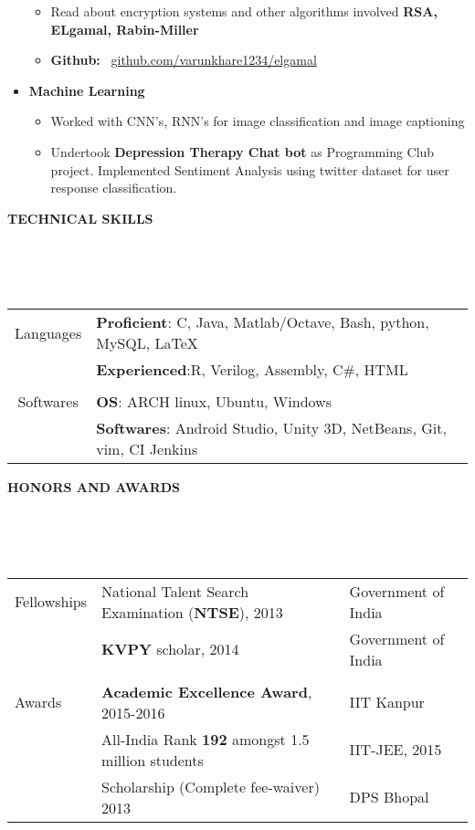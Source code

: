 \documentclass[a4paper,10pt]{article}
\newcommand{\lsep}{-0.5cm}
\newcommand{\resheading}[1]{{\small \colorbox{mygrey}{\begin{minipage}{0.975\textwidth}{\textbf{#1 \vphantom{p\^{E}}}}\end{minipage}}}}
\begin{document}
\begin{itemize}
\begin{itemize}
	\item Read about encryption systems and other algorithms involved \textbf{RSA, ELgamal, Rabin-Miller}
	\item \textbf{Github:} \ \href{https://github.com/varunkhare1234/elgamal}{github.com/varunkhare1234/elgamal}
	\end{itemize}
\item\textbf{Machine Learning}
    \begin{itemize}
    \item Worked with CNN's, RNN's for image classification and image captioning
    \item Undertook \textbf{Depression Therapy Chat bot} as Programming Club project. Implemented Sentiment Analysis using twitter dataset for user response classification.
    \end{itemize}
\end{itemize}	

\resheading{\textbf{TECHNICAL SKILLS} }\\[\lsep]
\\ \\
\indent \begin{tabular}{c @{\hskip 0.3in}| @{\hskip 0.1in}l}
    Languages & \textbf{Proficient}: C, Java, Matlab/Octave, Bash, python, MySQL, \LaTeX \\
     & \textbf{Experienced}:R, Verilog, Assembly, C\#, HTML\\
     \\
     Softwares & \textbf{OS}: ARCH linux, Ubuntu, Windows\\
     & \textbf{Softwares}: Android Studio, Unity 3D, NetBeans, Git, vim, CI Jenkins
\end{tabular}

\resheading{\textbf{HONORS AND AWARDS} }\\[\lsep]
\\ \\
\indent \begin{tabular}{l@{\hskip 0.24in}| @{\hskip 0.1in} l @{\hskip 0.3in} l}
    Fellowships & National Talent Search Examination (\textbf{NTSE}), 2013 & Government of India\\
     &  \textbf{KVPY} scholar, 2014 & Government of India\\
     \\
     Awards & \textbf{Academic Excellence Award}, 2015-2016 & IIT Kanpur\\
     & All-India Rank \textbf{192} amongst 1.5 million students & IIT-JEE, 2015\\
     & Scholarship (Complete fee-waiver) 2013 & DPS Bhopal\\
\end{tabular}{}
\end{document}
